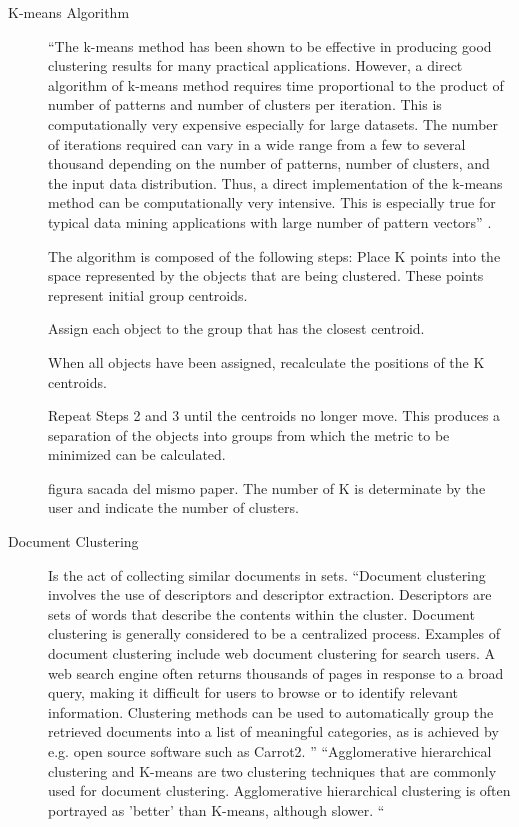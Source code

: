 \documentclass[fleqn,10pt]{SelfArx} %
\begin{document}
\begin{description}
	\item[K-means Algorithm] “The k-means method has been shown to be effective in producing good clustering results for many practical applications. However, a direct algorithm of k-means method requires time proportional to the product of number of patterns and number of clusters per iteration. This is computationally very expensive especially for large datasets.
	The number of iterations required can vary in a wide range from a few to several thousand depending on the number of patterns, number of clusters, and the input data distribution. Thus, a direct implementation of the k-means method can be computationally very intensive. This is especially true for typical data mining applications with large number of pattern vectors” \cite{K-means}. 
	
	The algorithm is composed of the following steps:
	Place K points into the space represented by the objects that are being clustered. These points represent initial group centroids.
	
	
	Assign each object to the group that has the closest centroid.
	
	
	When all objects have been assigned, recalculate the positions of the K centroids.
	
	
	Repeat Steps 2 and 3 until the centroids no longer move. This produces a separation of the objects into groups from which the metric to be minimized can be calculated.
	
	figura sacada del mismo paper. \cite{K-means Algorithm}
	The number of K is determinate by the user and indicate the number of clusters.
	
	\item[Document Clustering] Is the act of collecting similar documents in sets. “Document clustering involves the use of descriptors and descriptor extraction. Descriptors are sets of words that describe the contents within the cluster. Document clustering is generally considered to be a centralized process. Examples of document clustering include web document clustering for search users.
	A web search engine often returns thousands of pages in response to a broad query, making it difficult for users to browse or to identify relevant information. Clustering methods can be used to automatically group the retrieved documents into a list of meaningful categories, as is achieved by e.g. open source software such as Carrot2.
	” \cite{document clustering}
	“Agglomerative hierarchical clustering and K-means are two clustering techniques that are commonly used for document clustering. Agglomerative hierarchical clustering is often portrayed as 'better' than K-means, although slower. “ \cite{Doc_clust_techniques}
	

\end{description}
\end{document}
